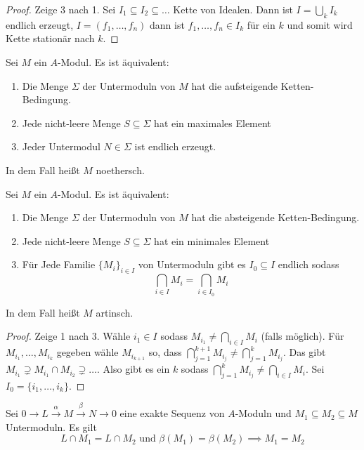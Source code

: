 \begin{proof}
    Zeige 3 nach 1. Sei \(I_1\subseteq I_2\subseteq\dots\) Kette von Idealen. Dann ist \(I=\bigcup_kI_k\) endlich erzeugt, \(I=(f_1,\dots,f_n)\) dann ist \(f_1,\dots,f_n\in I_k\) für ein \(k\) und somit wird Kette stationär nach \(k\).
\end{proof}
\begin{Satz}
    Sei \(M\) ein \(A\)-Modul. Es ist äquivalent:
    \begin{enumerate}
        \item Die Menge \(\Sigma\) der Untermoduln von \(M\) hat die aufsteigende Ketten-Bedingung.
        \item Jede nicht-leere Menge \(S\subseteq \Sigma\) hat ein maximales Element
        \item Jeder Untermodul \(N\in\Sigma\) ist endlich erzeugt.
    \end{enumerate}
    In dem Fall heißt \(M\) noethersch.
\end{Satz}
\begin{Satz}
    Sei \(M\) ein \(A\)-Modul. Es ist äquivalent:
    \begin{enumerate}
        \item Die Menge \(\Sigma\) der Untermoduln von \(M\) hat die absteigende Ketten-Bedingung.
        \item Jede nicht-leere Menge \(S\subseteq \Sigma\) hat ein minimales Element
        \item Für Jede Familie \(\{M_i\}_{i\in I}\) von Untermoduln gibt es \(I_0\subseteq I\) endlich sodass \[\bigcap_{i\in I}M_i=\bigcap_{i\in I_0}M_i\]
    \end{enumerate}
    In dem Fall heißt \(M\) artinsch.
\end{Satz}
\begin{proof}
    Zeige 1 nach 3. Wähle \(i_1\in I\) sodass \(M_{i_1}\neq\bigcap_{i\in I}M_i\) (falls möglich). Für \(M_{i_1},\dots,M_{i_k}\) gegeben wähle \(M_{i_{k+1}}\) so, dass \(\bigcap_{j=1}^{k+1}M_{i_j}\neq \bigcap_{j=1}^kM_{i_j}\). Das gibt \(M_{i_1}\supsetneq M_{i_1}\cap M_{i_2}\supsetneq\dots\). Also gibt es ein \(k\) sodass \(\bigcap_{j=1}^{k}M_{i_j}\neq \bigcap_{i\in I}M_{i}\). Sei \(I_0=\{i_1,\dots,i_k\}.\)
\end{proof}
\begin{Lemma}\label{Lem:UntermodExSeq}
    Sei \(0\to L\stackrel{\alpha}\to M\stackrel \beta\to N\to 0\) eine exakte Sequenz von \(A\)-Moduln und \(M_1\subseteq M_2\subseteq M\) Untermoduln. Es gilt 
    \[L\cap M_1=L\cap M_2\text{ und }\beta(M_1)=\beta(M_2)\implies M_1=M_2\]
\end{Lemma}
